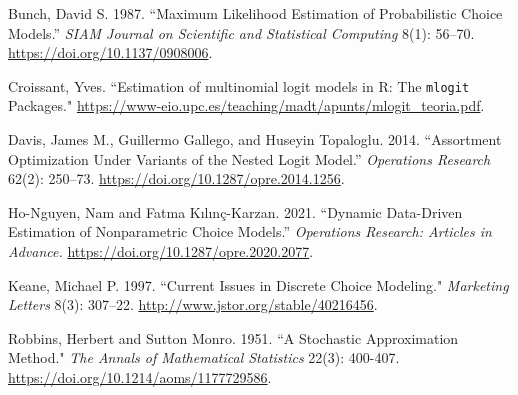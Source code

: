 \documentclass[preprint,12pt,authoryear]{elsarticle}
\begin{document}
\begin{thebibliography}{00}

Bunch, David S. 1987. ``Maximum Likelihood Estimation of Probabilistic Choice Models.'' \emph{SIAM Journal on Scientific and Statistical Computing} 8(1): 56--70. {\url{https://doi.org/10.1137/0908006}}. 

Croissant, Yves. ``Estimation of multinomial logit models in R: The \texttt{mlogit} Packages." {\url{https://www-eio.upc.es/teaching/madt/apunts/mlogit_teoria.pdf}}. 

Davis, James M.,  Guillermo Gallego, and Huseyin Topaloglu. 2014. ``Assortment Optimization Under Variants of the Nested Logit Model.'' \emph{Operations Research} 62(2): 250--73. {\url{https://doi.org/10.1287/opre.2014.1256}}. 

Ho-Nguyen, Nam and Fatma Kılınç-Karzan. 2021. ``Dynamic Data-Driven Estimation of Nonparametric Choice Models.'' \emph{Operations Research: Articles in Advance.} {\url{https://doi.org/10.1287/opre.2020.2077}}.

Keane, Michael P. 1997. ``Current Issues in Discrete Choice Modeling." \emph{Marketing Letters} 8(3): 307--22. {\url{http://www.jstor.org/stable/40216456}}.

Robbins, Herbert and Sutton Monro. 1951. ``A Stochastic Approximation Method." \emph{The Annals of Mathematical Statistics} 22(3): 400-407. {\url{https://doi.org/10.1214/aoms/1177729586}}. 


\end{thebibliography}
\end{document}
